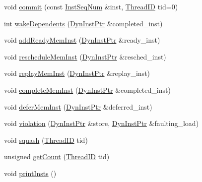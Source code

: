 \begin{DoxyCompactItemize}
\item 
void \hyperlink{classInstructionQueue_a04f8d2acf3cd0b90a1efc69b528f91bc}{commit} (const \hyperlink{inst__seq_8hh_a258d93d98edaedee089435c19ea2ea2e}{InstSeqNum} \&inst, \hyperlink{base_2types_8hh_ab39b1a4f9dad884694c7a74ed69e6a6b}{ThreadID} tid=0)
\item 
int \hyperlink{classInstructionQueue_aab5cfade3ce4bb4addbf52c7464676d9}{wakeDependents} (\hyperlink{classInstructionQueue_a028ce10889c5f6450239d9e9a7347976}{DynInstPtr} \&completed\_\-inst)
\item 
void \hyperlink{classInstructionQueue_a76bcc078140b3e79923f7b5be8b302fb}{addReadyMemInst} (\hyperlink{classInstructionQueue_a028ce10889c5f6450239d9e9a7347976}{DynInstPtr} \&ready\_\-inst)
\item 
void \hyperlink{classInstructionQueue_afdf61c4d00a7c48449b14c6f525e3869}{rescheduleMemInst} (\hyperlink{classInstructionQueue_a028ce10889c5f6450239d9e9a7347976}{DynInstPtr} \&resched\_\-inst)
\item 
void \hyperlink{classInstructionQueue_af6c215567b7a5a496ef245cd86df2e62}{replayMemInst} (\hyperlink{classInstructionQueue_a028ce10889c5f6450239d9e9a7347976}{DynInstPtr} \&replay\_\-inst)
\item 
void \hyperlink{classInstructionQueue_aad2715729f71f220e9cf9b99515384ca}{completeMemInst} (\hyperlink{classInstructionQueue_a028ce10889c5f6450239d9e9a7347976}{DynInstPtr} \&completed\_\-inst)
\item 
void \hyperlink{classInstructionQueue_ab1617ebdf253a795f97a7936a598e151}{deferMemInst} (\hyperlink{classInstructionQueue_a028ce10889c5f6450239d9e9a7347976}{DynInstPtr} \&deferred\_\-inst)
\item 
void \hyperlink{classInstructionQueue_aeea40175042f18a63a90cbbd7dd451bc}{violation} (\hyperlink{classInstructionQueue_a028ce10889c5f6450239d9e9a7347976}{DynInstPtr} \&store, \hyperlink{classInstructionQueue_a028ce10889c5f6450239d9e9a7347976}{DynInstPtr} \&faulting\_\-load)
\item 
void \hyperlink{classInstructionQueue_ad33d65c18c323d90695d7c2355b49af9}{squash} (\hyperlink{base_2types_8hh_ab39b1a4f9dad884694c7a74ed69e6a6b}{ThreadID} tid)
\item 
unsigned \hyperlink{classInstructionQueue_aaf7eb96b7ab2a8240d043b7d82494d15}{getCount} (\hyperlink{base_2types_8hh_ab39b1a4f9dad884694c7a74ed69e6a6b}{ThreadID} tid)
\item 
void \hyperlink{classInstructionQueue_afc9c0c90c27fe0dc8bd4da915596bc21}{printInsts} ()
\end{DoxyCompactItemize}
